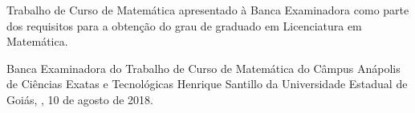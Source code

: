 \documentclass[
	12pt,				%
	openright,			%
    twoside,			%
	a4paper,			%
	english,			%
	french,				%
	spanish,			%
	brazil				%
	]{abntex2}
\numberwithin{lema}{chapter}
\numberwithin{teorema}{chapter}
\numberwithin{definicao}{chapter}
\numberwithin{exemplo}{chapter}
\numberwithin{figure}{chapter}
\renewcommand{\ABNTEXchapterfont}{\normalfont}
\begin{document}
%
% 
%
\begin{folhadeaprovacao}

  \begin{center}
  {\ABNTEXchapterfont\bfseries\large\imprimirtitulo}

    \vspace*{\fill}\vspace*{\fill}
    \begin{center}
    {\ABNTEXchapterfont\large\imprimirautor}
    \end{center}
    \vspace*{\fill}
    
\end{center}
\vfill  
      
   Trabalho de Curso de Matemática apresentado à Banca Examinadora como parte dos requisitos para a obtenção do grau de graduado em Licenciatura em Matemática. 
   
   Banca Examinadora do Trabalho de Curso de Matemática do Câmpus Anápolis de Ciências Exatas e Tecnológicas Henrique Santillo da Universidade Estadual de Goiás, \imprimirlocal, 10 de agosto de 2018.

\vfill

   \vfill
   \vfill
\vfill
      
  
\end{folhadeaprovacao}
\end{document}
